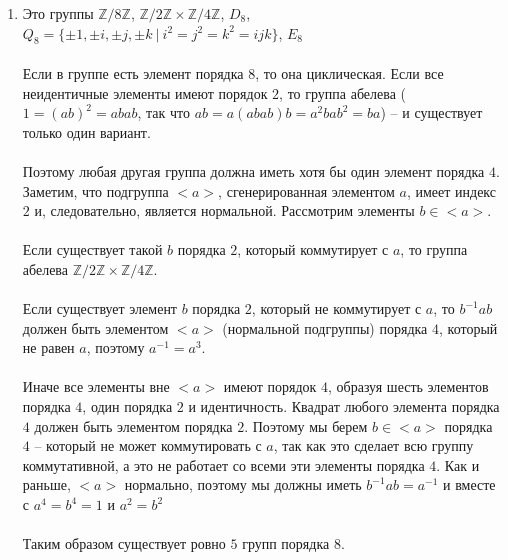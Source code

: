 \begin{enumerate}
			\item Это группы $\mathbb{Z} \slash 8 \mathbb{Z}$, $\mathbb{Z} \slash 2 \mathbb{Z} \times \mathbb{Z} \slash 4 \mathbb{Z}$, $D_8$, $Q_8 = \{ \pm 1, \pm i, \pm j, \pm k\ |\ i^2 = j^2 = k^2 = ijk \}$, $E_8$\\
			\\
			Если в группе есть элемент порядка $8$, то она циклическая. Если все неидентичные элементы имеют порядок $2$, то группа абелева ($1 = (ab)^2 = abab$, так что $ab = a(abab)b = a^2 ba b^2 = ba$) -- и существует только один вариант.\\ 
			\\
			Поэтому любая другая группа должна иметь хотя бы один элемент порядка $4$. Заметим, что подгруппа $<a>$, сгенерированная элементом $a$, имеет индекс $2$ и, следовательно, является нормальной. Рассмотрим элементы $b \in <a>$.\\ 
			\\
			Если существует такой $b$ порядка $2$, который коммутирует с $a$, то группа абелева $\mathbb{Z} \slash 2 \mathbb{Z} \times \mathbb{Z} \slash 4 \mathbb{Z}$.\\ 
			\\
			Если существует элемент $b$ порядка $2$, который не коммутирует с $a$, то $b^{-1}ab$ должен быть элементом $<a>$ (нормальной подгруппы) порядка $4$, который не равен $a$, поэтому $a^{-1} = a^3$.\\
			\\
			Иначе все элементы вне $<a>$ имеют порядок $4$, образуя шесть элементов порядка $4$, один порядка $2$ и идентичность. Квадрат любого элемента порядка $4$ должен быть элементом порядка $2$. Поэтому мы берем $b \in <a>$ порядка $4$ -- который не может коммутировать с $a$, так как это сделает всю группу коммутативной, а это не работает со всеми эти элементы порядка $4$. Как и раньше, $<a>$ нормально, поэтому мы должны иметь $b^{-1}ab = a^{-1}$ и вместе с $a^4 = b^4 = 1$ и $a^2 = b^2$\\
			\\
			Таким образом существует ровно $5$ групп порядка $8$.
		\end{enumerate}
		
